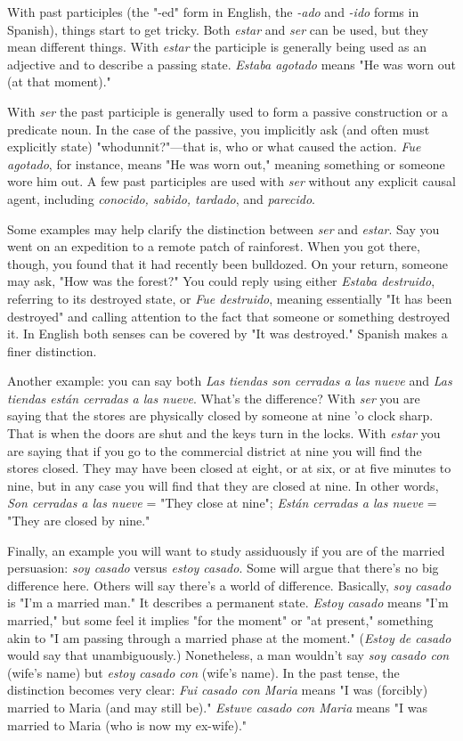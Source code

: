 \documentclass[14pt,a4paper,oneside]{memoir}
\begin{document}
With past participles (the "-ed" form in English, the \emph{-ado} and
\emph{-ido} forms in Spanish), things start to get tricky. Both \emph{estar} and \emph{ser}
can be used, but they mean different things. With \emph{estar} the participle
is generally being used as an adjective and to describe a passing state.
\emph{Estaba agotado} means "He was worn out (at that moment)."

With \emph{ser} the past participle is generally used to form a passive
construction or a predicate noun. In the case of the passive, you implicitly ask (and often must explicitly state) "whodunnit?"---that is,
who or what caused the action. \emph{Fue agotado}, for instance, means "He
was worn out," meaning something or someone wore him out. A few
past participles are used with \emph{ser} without any explicit causal agent, including \emph{conocido, sabido, tardado}, and \emph{parecido}.

Some examples may help clarify the distinction between \emph{ser}
and \emph{estar}. Say you went on an expedition to a remote patch of rainforest. When you got there, though, you found that it had recently been
bulldozed. On your return, someone may ask, "How was the forest?"
You could reply using either \emph{Estaba destruido}, referring to its destroyed state, or \emph{Fue destruido}, meaning essentially "It has been destroyed" and calling attention to the fact that someone or something
destroyed it. In English both senses can be covered by "It was destroyed." Spanish makes a finer distinction.

Another example: you can say both \emph{Las tiendas son cerradas a
	las nueve} and \emph{Las tiendas están cerradas a las nueve}. What's the difference? With \emph{ser} you are saying that the stores are physically closed
by someone at nine 'o clock sharp. That is when the doors are shut and
the keys turn in the locks. With \emph{estar} you are saying that if you go to
the commercial district at nine you will find the stores closed. They
may have been closed at eight, or at six, or at five minutes to nine, but
in any case you will find that they are closed at nine. In other words,
\emph{Son cerradas a las nueve} = "They close at nine"; \emph{Están cerradas a las
	nueve} = "They are closed by nine."

Finally, an example you will want to study assiduously if you
are of the married persuasion: \emph{soy casado} versus \emph{estoy casado}. Some
will argue that there's no big difference here. Others will say there's a
world of difference. Basically, \emph{soy casado} is "I'm a married man." It
describes a permanent state. \emph{Estoy casado} means "I'm married," but
some feel it implies "for the moment" or "at present," something akin
to "I am passing through a married phase at the moment." (\emph{Estoy de
	casado} would say that unambiguously.) Nonetheless, a man wouldn't
say \emph{soy casado con} (wife's name) but \emph{estoy casado con} (wife's name).
In the past tense, the distinction becomes very clear: \emph{Fui casado con
	Maria} means "I was (forcibly) married to Maria (and may still be)." \emph{Estuve casado con Maria} means "I was married to Maria (who is now my ex-wife)."
\end{document}
